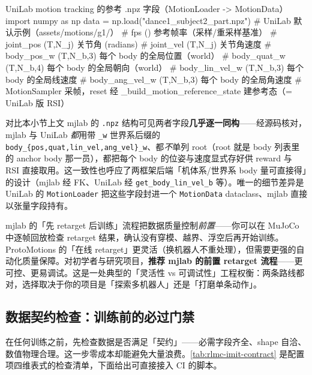 \begin{codebox}[Python]{UniLab motion tracking 的参考 .npz 字段（MotionLoader -> MotionData）}
import numpy as np
data = np.load("dance1_subject2_part.npz")   # UniLab 默认示例（assets/motions/g1/）
# fps            ()         参考帧率（采样/重采样基准）
# joint_pos      (T,N_j)    关节角 (radians)
# joint_vel      (T,N_j)    关节角速度
# body_pos_w     (T,N_b,3)  每个 body 的全局位置（world）
# body_quat_w    (T,N_b,4)  每个 body 的全局朝向（world）
# body_lin_vel_w (T,N_b,3)  每个 body 的全局线速度
# body_ang_vel_w (T,N_b,3)  每个 body 的全局角速度
# MotionSampler 采帧，reset 经 _build_motion_reference_state 建参考态（= UniLab 版 RSI）
\end{codebox}

对比本小节上文 mjlab 的 \texttt{.npz} 结构可见两者字段\textbf{几乎逐一同构}——经源码核对，mjlab 与 UniLab \emph{都}用带 \verb|_w| 世界系后缀的 \verb|body_{pos,quat,lin_vel,ang_vel}_w|、都\emph{不}单列 root（root 就是 body 列表里的 anchor body 那一员），都把每个 body 的位姿与速度显式存好供 reward 与 RSI 直接取用。这一致性也呼应了两框架后端「机体系/世界系 body 量可直接得」的设计（mjlab 经 FK、UniLab 经 \verb|get_body_lin_vel_b| 等）。唯一的细节差异是 UniLab 的 \verb|MotionLoader| 把这些字段封进一个 \verb|MotionData| dataclass、mjlab 直接以张量字段持有。

\begin{insight}\label{ins:rlmc-imit-pretarget}
mjlab 的「先 retarget 后训练」流程把数据质量控制\emph{前置}——你可以在 MuJoCo 中逐帧回放检查 retarget 结果，确认没有穿模、越界、浮空后再开始训练。ProtoMotions 的「在线 retarget」更灵活（换机器人不重处理），但需要更强的自动化质量保障。对初学者与研究项目，\textbf{推荐 mjlab 的前置 retarget 流程}——更可控、更易调试。这是一处典型的「灵活性 vs 可调试性」工程权衡：两条路线都对，选择取决于你的项目是「探索多机器人」还是「打磨单条动作」。
\end{insight}

\subsection{数据契约检查：训练前的必过门禁}
\label{sec:rlmc-imit-data-contract}

在任何训练之前，先检查数据是否满足「契约」——必需字段齐全、shape 自洽、数值物理合理。这一步零成本却能避免大量浪费。\cref{tab:rlmc-imit-contract} 是配置项四维表式的检查清单，下面给出可直接接入 CI 的脚本。

